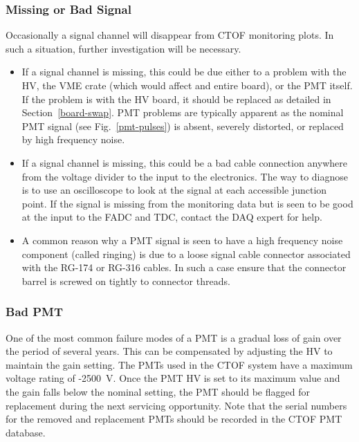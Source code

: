 \documentclass[12pt]{article}
\begin{document}
\subsubsection{Missing or Bad Signal}
\label{missing}

Occasionally a signal channel will disappear from CTOF monitoring plots. In such a situation, 
further investigation will be necessary. 

\begin{itemize}
\item If a signal channel is missing, this could be due either to a problem with the HV, the VME 
crate (which would affect and entire board), or the PMT itself. If the problem is with the HV 
board, it should be replaced as detailed in Section~\ref{board-swap}. PMT problems are typically 
apparent as the nominal PMT signal (see Fig.~\ref{pmt-pulses}) is absent, severely distorted, or 
replaced by high frequency noise.
\item If a signal channel is missing, this could be a bad cable connection anywhere from the 
voltage divider to the input to the electronics. The way to diagnose is to use an oscilloscope to 
look at the signal at each accessible junction point. If the signal is missing from the monitoring 
data but is seen to be good at the input to the FADC and TDC, contact the DAQ expert for help.
\item A common reason why a PMT signal is seen to have a high frequency noise component (called 
ringing) is due to a loose signal cable connector associated with the RG-174 or RG-316 cables. In 
such a case ensure that the connector barrel is screwed on tightly to connector threads.
\end{itemize}

\subsubsection{Bad PMT}
\label{bad-pmt}

One of the most common failure modes of a PMT is a gradual loss of gain over the period of
several years. This can be compensated by adjusting the HV to maintain the gain setting. The
PMTs used in the CTOF system have a maximum voltage rating of -2500~V. Once the PMT HV is set 
to its maximum value and the gain falls below the nominal setting, the PMT should be flagged 
for replacement during the next servicing opportunity. Note that the serial numbers for the
removed and replacement PMTs should be recorded in the CTOF PMT database.
\end{document}
